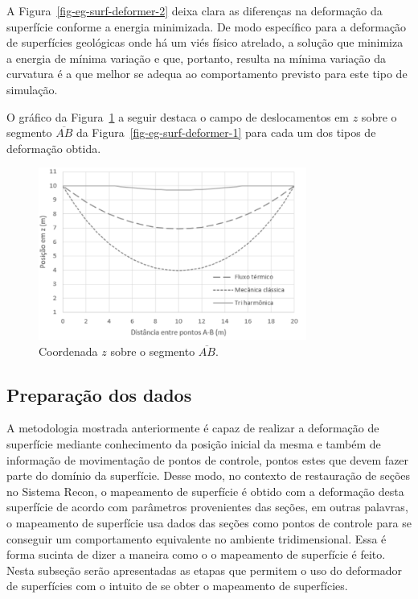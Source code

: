A Figura~\ref{fig-eg-surf-deformer-2} deixa clara as diferenças na deformação da superfície conforme a energia minimizada. De modo específico para a deformação de superfícies geológicas onde há um viés físico atrelado, a solução que minimiza a energia de mínima variação e que, portanto, resulta na mínima variação da curvatura é a que melhor se adequa ao comportamento previsto para este tipo de simulação.

O gráfico da Figura~\ref{fig-eg-surf-deformer-3} a seguir destaca o campo de deslocamentos em $z$ sobre o segmento $\overline{AB}$ da Figura~\ref{fig-eg-surf-deformer-1} para cada um dos tipos de deformação obtida.

\begin{figure} [H]
  \begin{center}
    \includegraphics[width=250pt]{images/fig-eg-surf-deformer-3}
    \caption{Coordenada $z$ sobre o segmento $\overline{AB}$.\cite{Muller}}\label{fig-eg-surf-deformer-3}
  \end{center}
\end{figure}

\subsection{Preparação dos dados}

 
A metodologia mostrada anteriormente é capaz de realizar a deformação de superfície mediante conhecimento da posição inicial da mesma e também de informação de movimentação de pontos de controle, pontos estes que devem fazer parte do domínio da superfície. Desse modo, no contexto de restauração de seções no Sistema Recon, o mapeamento de superfície é obtido com a deformação desta superfície de acordo com parâmetros provenientes das seções, em outras palavras, o mapeamento de superfície usa dados das seções como pontos de controle para se conseguir um comportamento equivalente no ambiente tridimensional. Essa é forma sucinta de dizer a maneira como o o mapeamento de superfície é feito. Nesta subseção serão apresentadas as etapas que permitem o uso do deformador de superfícies com o intuito de se obter o mapeamento de superfícies.

